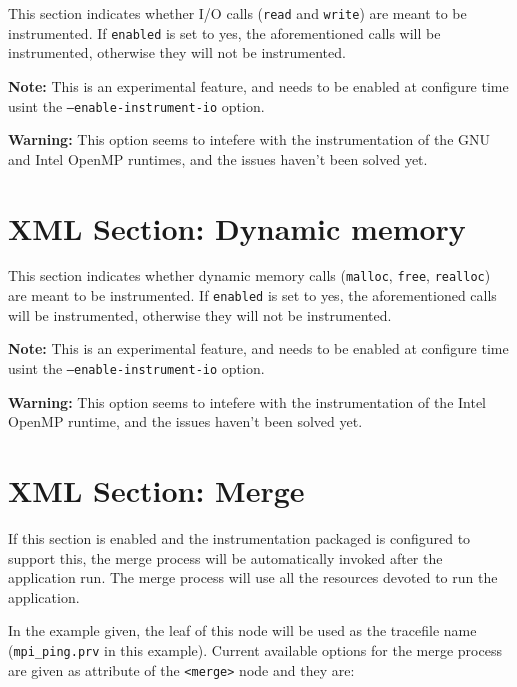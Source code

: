 

This section indicates whether I/O calls ({\tt read} and {\tt write}) are meant to be instrumented. If {\tt enabled} is set to yes, the aforementioned calls will be instrumented, otherwise they will not be instrumented.

{\bf Note:} This is an experimental feature, and needs to be enabled at configure time usint the {\tt --enable-instrument-io} option.

{\bf Warning:} This option seems to intefere with the instrumentation of the GNU and Intel OpenMP runtimes, and the issues haven't been solved yet.

\section{XML Section: Dynamic memory}\label{sec:XMLSectionDynamicMemory}



This section indicates whether dynamic memory calls ({\tt malloc}, {\tt free}, {\tt realloc}) are meant to be instrumented. If {\tt enabled} is set to yes, the aforementioned calls will be instrumented, otherwise they will not be instrumented.

{\bf Note:} This is an experimental feature, and needs to be enabled at configure time usint the {\tt --enable-instrument-io} option.

{\bf Warning:} This option seems to intefere with the instrumentation of the Intel OpenMP runtime, and the issues haven't been solved yet.

\section{XML Section: Merge}\label{sec:XMLSectionMerge}



If this section is enabled and the instrumentation packaged is configured to support this, the merge process will be automatically invoked after the application run. The merge process will use all the resources devoted to run the application.

In the example given, the leaf of this node will be used as the tracefile name ({\tt mpi\_ping.prv} in this example). Current available options for the merge process are given as attribute of the {\tt <merge>} node and they are:

